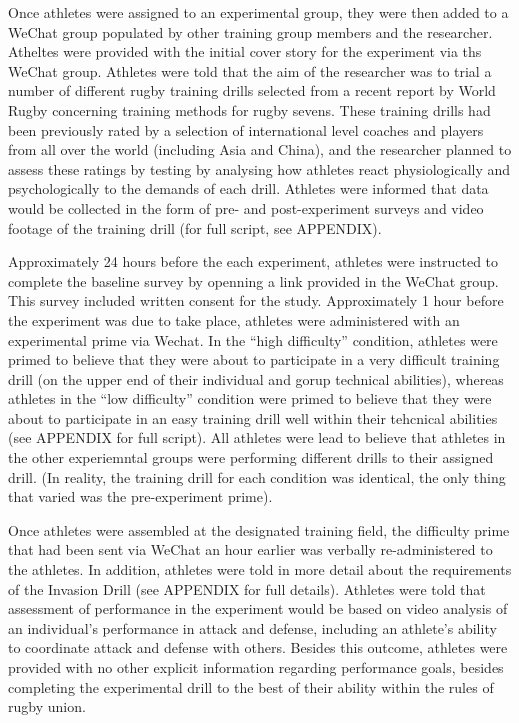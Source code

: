\documentclass[english]{article}\usepackage[]{graphicx}\usepackage[]{color}
\begin{document}
Once athletes were assigned to an experimental group, they were then added to a WeChat group populated by other training group members and the researcher. Atheltes were provided with the initial cover story for the experiment via ths WeChat group.  Athletes were told that the aim of the researcher was to trial a number of different rugby training drills selected from a recent report by World Rugby concerning training methods for rugby sevens.  These training drills had been previously rated by a selection of international level coaches and players from all over the world (including Asia and China), and the researcher planned to assess these ratings by testing by analysing how athletes react physiologically and psychologically to the demands of each drill.  Athletes were informed that data would be collected in the form of pre- and post-experiment surveys and video footage of the training drill (for full script, see APPENDIX).

Approximately 24 hours before the each experiment, athletes were instructed to complete the baseline survey by openning a link provided in the WeChat group.  This survey included written consent for the study. Approximately 1 hour before the experiment was due to take place, athletes were administered with an experimental prime via Wechat.  In the ``high difficulty'' condition, athletes were primed to believe that they were about to participate in a very difficult training drill (on the upper end of their individual and gorup technical abilities), whereas athletes in the ``low difficulty'' condition were primed to believe that they were about to participate in an easy training drill well within their tehcnical abilities (see APPENDIX for full script). All athletes were lead to believe that athletes in the other experiemntal groups were performing different drills to their assigned drill. (In reality, the training drill for each condition was identical, the only thing that varied was the pre-experiment prime).

Once athletes were assembled at the designated training field, the difficulty prime that had been sent via WeChat an hour earlier was verbally re-administered to the athletes. In addition, athletes were told in more detail about the requirements of the Invasion Drill (see APPENDIX for full details).  Athletes were told that assessment of performance in the experiment would be based on video analysis of an individual's performance in attack and defense, including an athlete's ability to coordinate attack and defense with others. Besides this outcome, athletes were provided with no other explicit information regarding performance goals, besides completing the experimental drill to the best of their ability within the rules of rugby union.
\end{document}
